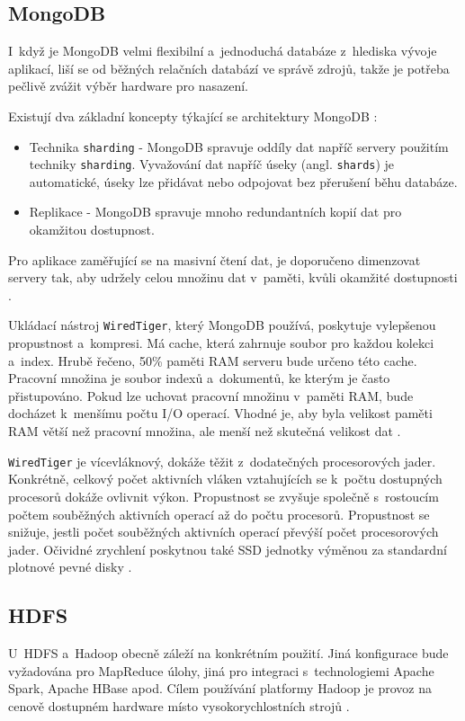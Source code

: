 \subsection{MongoDB}
I~když je MongoDB velmi flexibilní a~jednoduchá databáze z~hlediska vývoje aplikací, liší se od běžných relačních databází ve správě zdrojů, takže je potřeba pečlivě zvážit výběr hardware pro nasazení.

Existují dva základní koncepty týkající se architektury MongoDB \cite{hwProvisioningMongoDB}:

\begin{itemize}
    \item Technika \texttt{sharding} - MongoDB spravuje oddíly dat napříč servery použitím techniky \texttt{sharding}. Vyvažování dat napříč úseky (angl. \texttt{shards}) je automatické, úseky lze přidávat nebo odpojovat bez přerušení běhu databáze.
    
    \item Replikace - MongoDB spravuje mnoho redundantních kopií dat pro okamžitou dostupnost.
\end{itemize}

\noindent Pro aplikace zaměřující se na masivní čtení dat, je doporučeno dimenzovat servery tak, aby udržely celou množinu dat v~paměti, kvůli okamžité dostupnosti \cite{hwProvisioningMongoDB}.

Ukládací nástroj \texttt{WiredTiger}, který MongoDB používá, poskytuje vylepšenou propustnost a~kompresi. Má cache, která zahrnuje soubor pro každou kolekci a~index. Hrubě řečeno, 50\% paměti RAM serveru bude určeno této cache. Pracovní množina je soubor indexů a~dokumentů, ke kterým je často přistupováno. Pokud lze uchovat pracovní množinu v~paměti RAM, bude docházet k~menšímu počtu I/O operací. Vhodné je, aby byla velikost paměti RAM větší než pracovní množina, ale menší než skutečná velikost dat \cite{sizeYourMongoDBClusters}.

\texttt{WiredTiger} je vícevláknový, dokáže těžit z~dodatečných procesorových jader. Konkrétně, celkový počet aktivních vláken vztahujících se k~počtu dostupných procesorů dokáže ovlivnit výkon. Propustnost se zvyšuje společně s~rostoucím počtem souběžných aktivních operací až do počtu procesorů. Propustnost se snižuje, jestli počet souběžných aktivních operací převýší počet procesorových jader. Očividné zrychlení poskytnou také SSD jednotky výměnou za standardní plotnové pevné disky \cite{mongoDBProductionNotes}.

\subsection{HDFS}
U~HDFS a~Hadoop obecně záleží na konkrétním použití. Jiná konfigurace bude vyžadována pro MapReduce úlohy, jiná pro integraci s~technologiemi Apache Spark, Apache HBase apod. Cílem používání platformy Hadoop je provoz na cenově dostupném hardware místo vysokorychlostních strojů \cite{hadoopHardware}.

